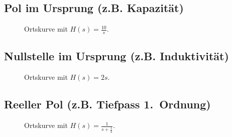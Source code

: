 {\newpage

\vspace*{-5mm}\subsection{Pol im Ursprung (z.B. Kapazit\"at)}
\vspace*{-5mm}
\begin{figure}[!htb]%
\vspace*{-4mm}
\begin{center}
  \vspace*{-3mm}\caption{Ortskurve mit $H(s)=\frac{10}{s}$.}
\end{center}
\vspace*{-6mm}
\end{figure}


\vspace*{-5mm}\subsection{Nullstelle im Ursprung (z.B. Induktivit\"at)}
\vspace*{-5mm}
\begin{figure}[!htb]%
\vspace*{-8mm}
\begin{center}
  \vspace*{-3mm}\caption{Ortskurve mit $H(s)=2 s$.}
\end{center}
\vspace*{-6mm}
\end{figure}

\newpage

\vspace*{-5mm}\subsection{Reeller Pol (z.B. Tiefpass 1.~Ordnung)}
\vspace*{-5mm}
\begin{figure}[!htb]
\vspace*{-5mm}
\begin{center}
  \vspace*{-3mm}\caption{Ortskurve mit $H(s)=\frac{1}{s+\frac{1}{3}}$.}
\end{center}
\vspace*{-6mm}
\end{figure}

}
